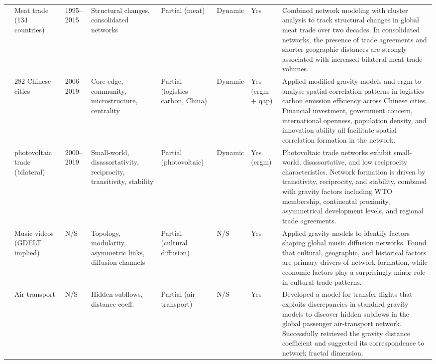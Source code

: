 \documentclass[preprint, 3p,
authoryear]{elsarticle} %
\begin{document}
\begin{landscape}
\begin{longtable}{p{2.2cm}p{2cm}p{1.5cm}p{3.0cm}p{1.8cm}p{1.2cm}p{1.2cm}p{8cm}}
\cite{chung2020spatial} & Meat trade (134 countries) & 1995–2015 & Structural changes, consolidated networks & Partial (meat) & Dynamic & Yes & Combined network modeling with cluster analysis to track structural changes in global meat trade over two decades. In consolidated networks, the presence of trade agreements and shorter geographic distances are strongly associated with increased bilateral meat trade volumes. \\
\addlinespace

\cite{dong2024spatial} & 282 Chinese cities & 2006–2019 & Core-edge, community, microstructure, centrality & Partial (logistics carbon, China) & Dynamic & Yes (\gls{ergm} + \gls{qap}) & Applied modified gravity models and \gls{ergm} to analyse spatial correlation patterns in logistics carbon emission efficiency across Chinese cities. Financial investment, government concern, international openness, population density, and innovation ability all facilitate spatial correlation formation in the network.  \\
\addlinespace

\cite{chen2023complex} & photovoltaic trade (bilateral) & 2000–2019 & Small-world, disassortativity, reciprocity, transitivity, stability & Partial (photovoltaic) & Dynamic & Yes (\gls{ergm}) & Photovoltaic trade networks exhibit small-world, disassortative, and low reciprocity characteristics. Network formation is driven by transitivity, reciprocity, and stability, combined with gravity factors including WTO membership, continental proximity, asymmetrical development levels, and regional trade agreements.  \\
\addlinespace

\cite{duenas2023structure} & Music videos (GDELT implied) & N/S & Topology, modularity, asymmetric links, diffusion channels & Partial (cultural diffusion) & N/S & Yes & Applied gravity models to identify factors shaping global music diffusion networks. Found that cultural, geographic, and historical factors are primary drivers of network formation, while economic factors play a surprisingly minor role in cultural trade patterns. \\
\addlinespace

\cite{ryczkowski2017transfer} & Air transport & N/S & Hidden subflows, distance coeff. & Partial (air transport) & N/S & Yes & Developed a model for transfer flights that exploits discrepancies in standard gravity models to discover hidden subflows in the global passenger air-transport network. Successfully retrieved the gravity distance coefficient and suggested its correspondence to network fractal dimension. \\

\bottomrule
\end{longtable}
\end{landscape}
\end{document}
